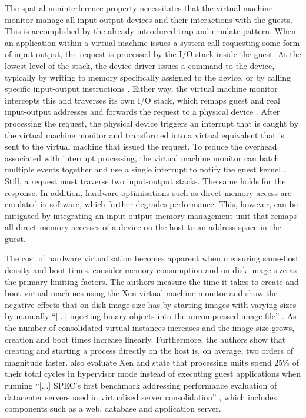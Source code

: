 The spatial noninterference property necessitates that the virtual machine monitor manage 
all input-output devices and their interactions with the guests. This is accomplished by the
already introduced trap-and-emulate pattern. When an application within a virtual machine 
issues a system call requesting some form of input-output, the request is processed by the 
I/O stack inside the guest. At the lowest level of the stack, the device driver issues a 
command to the device, typically by writing to memory specifically assigned to the device, or by
calling specific input-output instructions \cite{10.5555/2490781}. 
Either way, the virtual machine monitor intercepts this and traverses its own I/O stack, which 
remaps guest and real input-output addresses and forwards the request to a physical device \cite{10.1145/2063176.2063194}. 
After processing the request, the physical device triggers an interrupt that is caught by the virtual machine monitor and 
transformed into a virtual equivalent that is sent to the virtual machine that issued the request.
To reduce the overhead associated with interrupt processing, the virtual machine monitor can batch 
multiple events together and use a single interrupt to notify the guest kernel \cite{10.1145/2063176.2063194}.
Still, a request must traverse two input-output stacks. The same holds for the response.
In addition, hardware optimisations such as direct memory access are emulated in software, which 
further degrades performance. This, however, can be mitigated by integrating an input-output memory management 
unit that remaps all direct memory accesses of a device on the host to an address space in the guest.

The cost of hardware virtualisation becomes apparent when measuring same-host density
and boot times. \textcite{10.1145/3132747.3132763} consider memory consumption and on-disk image size
as the primary limiting factors. The authors measure the time it takes to create and boot
virtual machines using the Xen virtual machine monitor and show the negative effects that on-disk image size has 
by starting images with 
varying sizes by manually \enquote{[...] injecting binary objects into the uncompressed image file} \cite[3]{10.1145/3132747.3132763}. 
As the number of consolidated virtual instances increases and the image size grows, 
creation and boot times increase linearly.
Furthermore, the authors show that creating and starting a process directly on the host is, on average, 
two orders of magnitude faster. \textcite{10.1145/2151024.2151030} also evaluate Xen and state
that processing units spend 25\% of their total cycles in hypervisor mode instead of executing guest applications 
when running \enquote{[...] SPEC's first benchmark addressing performance evaluation of datacenter servers used in 
virtualised server consolidation} \cite[2]{10.1145/2151024.2151030}, which includes components 
such as a web, database and application server.

